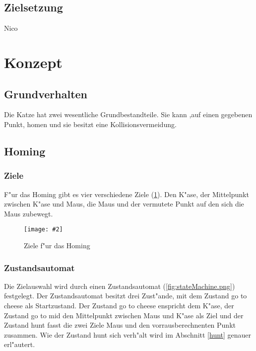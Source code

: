 \documentclass[
a4paper,     %
12pt         %
]{scrartcl}  %
\newcommand{\mygraphics}[3]{
\begin{figure}[!h]
  \begin{center}
    \texttt{[image: \#2]} \\    
    \caption{#3}\label{fig:#2}
  \end{center}
\end{figure}

}
\begin{document}
\subsection{Zielsetzung}
Nico
\clearpage

\section{Konzept}
\subsection{Grundverhalten}
Die Katze hat zwei wesentliche Grundbestandteile. Sie kann ,auf einen gegebenen Punkt, \glqq homen\grqq{} und sie besitzt eine Kollisionsvermeidung.
\subsection{Homing}
\subsubsection{Ziele}
F"ur das Homing gibt es vier verschiedene Ziele (\ref{fig:homingZiele.png}). Den K"ase, der Mittelpunkt zwischen K"ase und Maus, die Maus und der vermutete Punkt auf den sich die Maus zubewegt.
\mygraphics{0.7\textwidth}{homingZiele.png}{Ziele f"ur das Homing}
\clearpage
\subsubsection{Zustandsautomat}
Die Zielauswahl wird durch einen Zustandsautomat (\ref{fig:stateMachine.png}) festgelegt.
Der Zustandsautomat besitzt drei Zust"ande, mit dem Zustand \glqq go to cheese\grqq{} als Startzustand. Der Zustand \glqq go to cheese\grqq{} enspricht dem K"ase, der Zustand \glqq go to mid\grqq{} den Mittelpunkt zwischen Maus und K"ase als Ziel und der Zustand \glqq hunt\grqq{} fasst die zwei Ziele Maus und den vorrausberechnenten Punkt zusammen. Wie der Zustand \glqq hunt\grqq{} sich verh"alt wird im Abschnitt \ref{hunt} genauer erl"autert.\\
\hspace*{0.63\textwidth}
\end{document}

